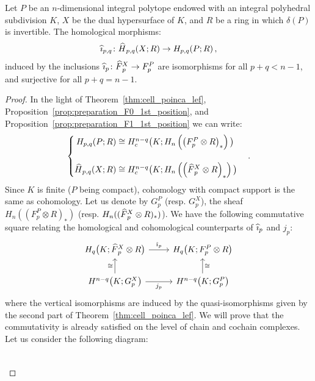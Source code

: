 \documentclass[AHL,Unicode,longabstracts,published]{cedram}
\makeatletter
\newcommand{\Fbar}{\hat{F}}
\newcommand{\Hbar}{\hat{H}}
\newcommand{\ibar}{\hat{\imath}}
\newenvironment{alcases}{\left\{\begingroup\arraycolsep=0pt\renewcommand{\arraystretch}{1.2}\begin{array}{r@{\;}l@{\quad}l}}{\end{array}\endgroup\right.}
\let\oldhat\hat
\renewcommand*{\hat}[1]{\mathchoice{\widehat{#1}}{\widehat{#1}}{\oldhat{#1}}{\oldhat{#1}}}
\makeatother
\begin{document}
\begin{theo}\label{thm:Lefschetz_hyp_sec}
Let $P$ be an $n$-dimensional integral polytope endowed with an integral polyhedral subdivision $K$, $X$ be the dual hypersurface of $K$, and $R$ be a ring in which $\delta(P)$ is invertible. The homological morphisms:
\begin{equation*}
\ibar_{p,q}\colon \Hbar_{p,q}(X;R)\rightarrow H_{p,q}(P; R)\,,
\end{equation*}
induced by the inclusions $\ibar_p\colon \Fbar_p^{X}\rightarrow F_p^{P}$ are isomorphisms for all $p+q<n-1$, and surjective for all $p+q=n-1$.
\end{theo}

\begin{proof}
In the light of Theorem~\ref{thm:cell_poinca_lef}, Proposition~\ref{prop:preparation_F0_1st_position}, and Proposition~\ref{prop:preparation_F1_1st_position} we can write:
\begin{equation*}
\begin{alcases}
H_{p,q}(P; R)&\cong H^{n-q}_c\big(K;H_n\left(\left(F^{P}_p\otimes R\right)_*\right)\big) \\ \\ \Hbar_{p,q}(X; R)&\cong H^{n-q}_c\big(K;H_n\left(\left(\Fbar^{X}_p\otimes R\right)_*\right)\big)
\end{alcases}\,.
\end{equation*}
Since $K$ is finite ($P$ being compact), cohomology with compact support is the same as cohomology. Let us denote by $G^{P}_p$ (resp. $G^{X}_p$), the sheaf $H_n((F^{P}_p\otimes R)_*)$ (resp. $H_n((\Fbar^{X}_p\otimes R)_*)$). We have the following commutative square relating the homological and cohomological counterparts of $\ibar_p$ and $j_p$:
\begin{equation*}
\begin{tikzcd}
H_{q}\big(K;\Fbar^{X}_p\otimes R\big) \arrow[r,"\ibar_p"] & H_{q}\big(K;F^{P}_p\otimes R\big) \\%
H^{n-q}\big(K;G^{X}_p\big) \arrow[r,"j_p" below] \ar[u,"\cong" left] & H^{n-q}\big(K;G^{P}_p\big) \ar[u,"\cong" right]
\end{tikzcd}
\end{equation*}
where the vertical isomorphisms are induced by the quasi-isomorphisms given by the second part of Theorem~\ref{thm:cell_poinca_lef}. We will prove that the commutativity is already satisfied on the level of chain and cochain complexes. Let us consider the following diagram:
\begin{equation*}
\begin{tikzcd}

\end{tikzcd}
\end{equation*}
\end{proof}
\end{document}
